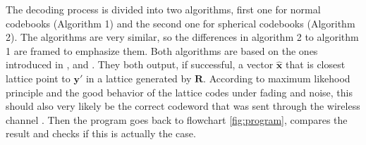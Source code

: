 \documentclass[english,12pt,a4paper,pdftex,sci,utf8]{aaltothesis}
\begin{document}
\par The decoding process is divided into two algorithms, first one for normal codebooks (Algorithm 1) and the second one for spherical codebooks (Algorithm 2). The algorithms are very similar, so the differences in algorithm 2 to algorithm 1 are framed to emphasize them. Both algorithms are based on the ones introduced in \cite{mia}, \cite{ranto} and \cite{damen}. They both output, if successful, a vector $\mathbf{\hat{x}}$ that is closest lattice point to $\mathbf{y}'$ in a lattice generated by $\mathbf{R}$. According to maximum likehood principle and the good behavior of the lattice codes under fading and noise, this should also very likely be the correct codeword that was sent through the wireless channel \cite{mia}. Then the program goes back to flowchart \ref{fig:program}, compares the result and checks if this is actually the case.
\end{document}
